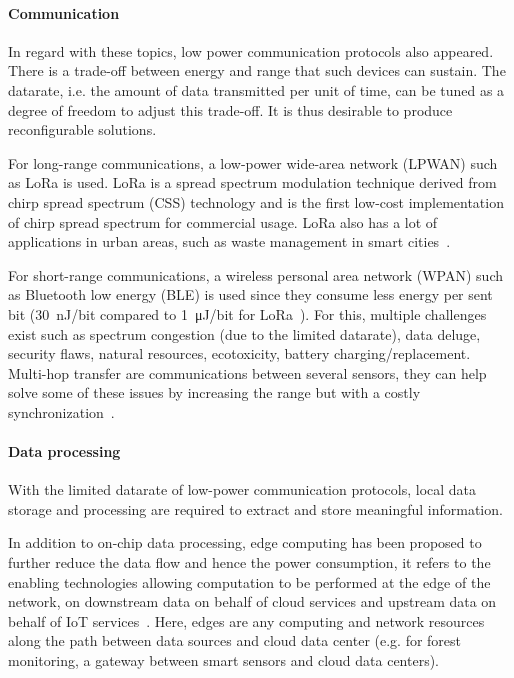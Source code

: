 \documentclass{EPL-master-thesis-covers-EN}
\begin{document}
\paragraph{Communication}

In regard with these topics, low power communication protocols also appeared. There is a trade-off between energy and range that such devices can sustain. The datarate, i.e. the amount of data transmitted per unit of time, can be tuned as a degree of freedom to adjust this trade-off. It is thus desirable to produce reconfigurable solutions.

For long-range communications, a low-power wide-area network (LPWAN) such as LoRa is used. LoRa is a spread spectrum modulation technique derived from chirp spread spectrum (CSS) technology and is the first low-cost implementation of chirp spread spectrum for commercial usage. LoRa also has a lot of applications in urban areas, such as waste management in smart cities~\cite{Cerchecci}.

For short-range communications, a wireless personal area network (WPAN) such as Bluetooth low energy (BLE) is used since they consume less energy per sent bit (\SI{30}{nJ/bit} compared to \SI{1}{\micro J/bit} for LoRa~\cite{Local_Sensor_Data_Processing}). For this, multiple challenges exist such as spectrum congestion (due to the limited datarate), data deluge, security flaws, natural resources, ecotoxicity, battery charging/replacement. Multi-hop transfer are communications between several sensors, they can help solve some of these issues by increasing the range but with a costly synchronization~\cite{bol2018}.

\paragraph{Data processing}

With the limited datarate of low-power communication protocols, local data storage and processing are required to extract and store meaningful information.

In addition to on-chip data processing, edge computing has been proposed to further reduce the data flow and hence the power consumption, it refers to the enabling technologies allowing computation to be performed at the edge of the network, on downstream data on behalf of cloud services and upstream data on behalf of IoT services~\cite{Shi2016}. Here, edges are any computing and network resources along the path between data sources and cloud data center (e.g. for forest monitoring, a gateway between smart sensors and cloud data centers). 
\end{document}
